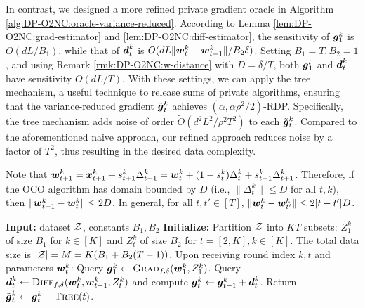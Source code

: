 In contrast, we designed a more refined private gradient oracle in Algorithm \ref{alg:DP-O2NC:oracle-variance-reduced}. According to Lemma \ref{lem:DP-O2NC:grad-estimator} and \ref{lem:DP-O2NC:diff-estimator}, the sensitivity of ${\boldsymbol{g}}_1^k$ is $O(dL/B_1)$, while that of ${\boldsymbol{d}}_t^k$ is $O(dL\|{\boldsymbol{w}}_t^k-{\boldsymbol{w}}_{t-1}^k\|/B_2\delta)$. Setting $B_1=T,B_2=1$, and using Remark \ref{rmk:DP-O2NC:w-distance} with $D=\delta/T$, both ${\boldsymbol{g}}_1^l$ and ${\boldsymbol{d}}_t^k$ have sensitivity $O(dL/T)$.
With these settings, we can apply the tree mechanism, a useful technique to release sums of private algorithms, ensuring that the variance-reduced gradient $\tilde{{\boldsymbol{g}}}_t^k$ achieves $(\alpha,\alpha\rho^2/2)$-RDP. Specifically, the tree mechanism  adds noise of order $\tilde O(d^2L^2/\rho^2T^2)$ to each $\tilde{{\boldsymbol{g}}}_t^k$. Compared to the aforementioned naive approach, our refined approach reduces noise by a factor of $T^2$, thus resulting in the desired data complexity. 

\begin{remark}
\label{rmk:DP-O2NC:w-distance}
Note that ${\boldsymbol{w}}_{t+1}^k = {\boldsymbol{x}}_{t+1}^k + s_{t+1}^k\Delta_{t+1}^k = {\boldsymbol{w}}_t^k + (1-s_t^k)\Delta_t^k + s_{t+1}^k\Delta_{t+1}^k$. Therefore, if the OCO algorithm has domain bounded by $D$ (i.e., $\|\Delta_t^k\| \le D$ for all $t,k$), then $\|{\boldsymbol{w}}_{t+1}^k-{\boldsymbol{w}}_t^k\| \le 2D$. In general, for all $t,t'\in[T]$, $\|{\boldsymbol{w}}_t^k - {\boldsymbol{w}}_{t'}^k\| \le 2|t-t'|D$.
\end{remark}


\begin{algorithm}[t]
\caption{Private variance-reduced gradient oracle $\calO$}
\label{alg:DP-O2NC:oracle-variance-reduced}
\begin{algorithmic}[1]
    \Statex \textbf{Input:} dataset ${\cal Z}$, constants $B_1, B_2$
    \Statex \textbf{Initialize:} Partition ${\cal Z}$ into $KT$ subsets: $Z_1^k$ of size $B_1$ for $k\in[K]$ and $Z_t^k$ of size $B_2$ for $t=[2,K],k\in[K]$. The total data size is $|{\cal Z}| = M = K(B_1+B_2(T-1))$.
    \State Upon receiving round index $k,t$ and parameters ${\boldsymbol{w}}_t^k$:
        \State Query ${\boldsymbol{g}}_1^k \gets {\normalfont\textsc{Grad}}_{f,\delta}({\boldsymbol{w}}_1^k,Z_1^k)$.
    \Else
        \State Query ${\boldsymbol{d}}_t^k \gets {\normalfont\textsc{Diff}}_{f,\delta}({\boldsymbol{w}}_t^k,{\boldsymbol{w}}_{t-1}^k,Z_t^k)$ and compute ${\boldsymbol{g}}_t^k \gets {\boldsymbol{g}}_{t-1}^k + {\boldsymbol{d}}_t^k$.
    \EndIf
    \State Return $\tilde{{\boldsymbol{g}}}_t^k \gets {\boldsymbol{g}}_t^k + \textsc{Tree}(t)$.
\end{algorithmic}
\end{algorithm}

